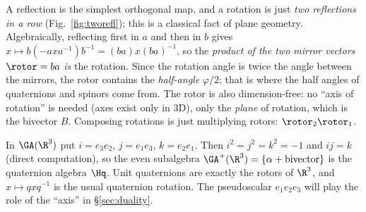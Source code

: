 

\begin{intuition}
A reflection is the simplest orthogonal map, and a rotation is just \emph{two reflections in a row} (Fig.~\ref{fig:tworefl}); this is a classical fact of plane geometry.
Algebraically, reflecting first in $a$ and then in $b$ gives $x\mapsto b(-axa^{-1})b^{-1}=(ba)x(ba)^{-1}$, so the \emph{product of the two mirror vectors} $\rotor=ba$ \emph{is} the rotation.
Since the rotation angle is twice the angle between the mirrors, the rotor contains the \emph{half-angle} $\varphi/2$; that is where the half angles of quaternions and spinors come from. The rotor is also dimension-free: no ``axis of rotation'' is needed (axes exist only in $3$D), only the \emph{plane} of rotation, which is the bivector $B$. Composing rotations is just multiplying rotors: $\rotor_2\rotor_1$.
\end{intuition}

\begin{example}
In $\GA(\R^3)$ put $i=e_3e_2$, $j=e_1e_3$, $k=e_2e_1$. Then $i^2=j^2=k^2=-1$ and $ij=k$ (direct computation), so the even subalgebra $\GA^+(\R^3)=\{\alpha+\text{bivector}\}$ is the quaternion algebra $\Hq$. Unit quaternions are exactly the rotors of $\R^3$, and $x\mapsto qxq^{-1}$ is the usual quaternion rotation. The pseudoscalar $e_1e_2e_3$ will play the role of the ``axis'' in \S\ref{sec:duality}.
\end{example}
